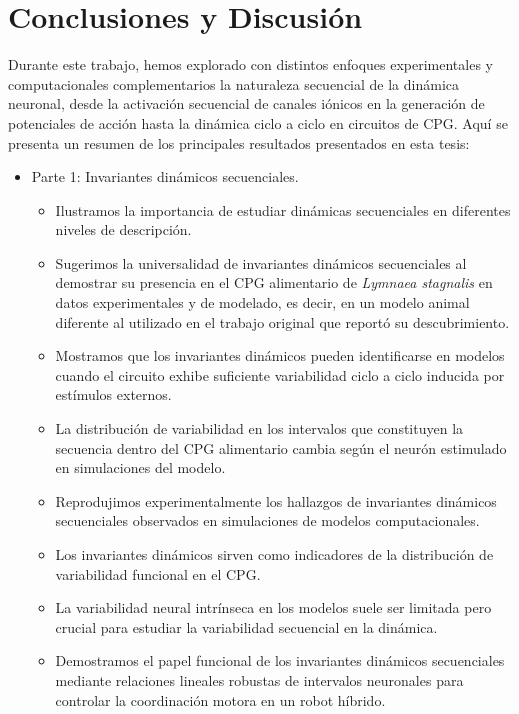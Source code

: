 \chapter{Conclusiones y Discusión} %

Durante este trabajo, hemos explorado con distintos enfoques experimentales y computacionales complementarios la naturaleza secuencial de la dinámica neuronal, desde la activación secuencial de canales iónicos en la generación de potenciales de acción hasta la dinámica ciclo a ciclo en circuitos de CPG. Aquí se presenta un resumen de los principales resultados presentados en esta tesis:

\begin{itemize}
	\item Parte 1: Invariantes dinámicos secuenciales.
	\begin{itemize}
		\item Ilustramos la importancia de estudiar dinámicas secuenciales en diferentes niveles de descripción.
		\item Sugerimos la universalidad de invariantes dinámicos secuenciales al demostrar su presencia en el CPG alimentario de \textit{Lymnaea stagnalis} en datos experimentales y de modelado, es decir, en un modelo animal diferente al utilizado en el trabajo original que reportó su descubrimiento.
		\item Mostramos que los invariantes dinámicos pueden identificarse en modelos cuando el circuito exhibe suficiente variabilidad ciclo a ciclo inducida por estímulos externos.
		\item La distribución de variabilidad en los intervalos que constituyen la secuencia dentro del CPG alimentario cambia según el neurón estimulado en simulaciones del modelo.
		\item Reprodujimos experimentalmente los hallazgos de invariantes dinámicos secuenciales observados en simulaciones de modelos computacionales.
		\item Los invariantes dinámicos sirven como indicadores de la distribución de variabilidad funcional en el CPG.
		\item La variabilidad neural intrínseca en los modelos suele ser limitada pero crucial para estudiar la variabilidad secuencial en la dinámica.
		\item Demostramos el papel funcional de los invariantes dinámicos secuenciales mediante relaciones lineales robustas de intervalos neuronales para controlar la coordinación motora en un robot híbrido.
	\end{itemize}
	

\end{itemize}
